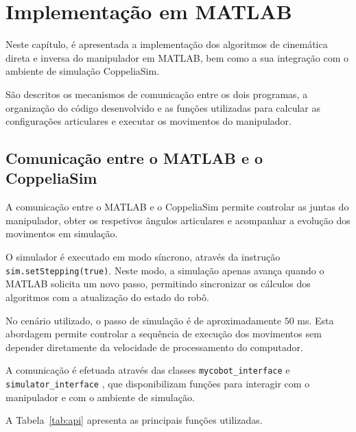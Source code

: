 \chapter{Implementação em MATLAB}
\label{ch:imp}

Neste capítulo, é apresentada a implementação dos algoritmos de cinemática direta e inversa do manipulador em MATLAB, bem como a sua integração com o ambiente de simulação CoppeliaSim.

São descritos os mecanismos de comunicação entre os dois programas, a organização do código desenvolvido e as funções utilizadas para calcular as configurações articulares e executar os movimentos do manipulador.

\section{Comunicação entre o MATLAB e o CoppeliaSim}
\label{sec:comunicacao}

A comunicação entre o MATLAB e o CoppeliaSim \cite{louro_matlab, louro_codigo, coppelia_zmq} permite controlar as juntas do manipulador, obter os respetivos ângulos articulares e acompanhar a evolução dos movimentos em simulação.

O simulador é executado em modo síncrono, através da instrução \texttt{sim.setStepping(true)}. Neste modo, a simulação apenas avança quando o MATLAB solicita um novo passo, permitindo sincronizar os cálculos dos algoritmos com a atualização do estado do robô.

No cenário utilizado, o passo de simulação é de aproximadamente $50$ ms. Esta abordagem permite controlar a sequência de execução dos movimentos sem depender diretamente da velocidade de processamento do computador.

A comunicação é efetuada através das classes \texttt{mycobot\_interface} e \texttt{simulator\_interface} \cite{louro_codigo}, que disponibilizam funções para interagir com o manipulador e com o ambiente de simulação.

A Tabela~\ref{tab:api} apresenta as principais funções utilizadas.

